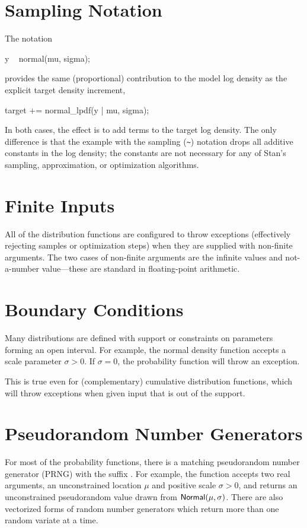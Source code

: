 \section{Sampling Notation}

The notation
%
\begin{stancode}
y ~ normal(mu, sigma);
\end{stancode}
%
provides the same (proportional) contribution to the model log density
as the explicit target density increment,
%
\begin{stancode}
target += normal_lpdf(y | mu, sigma);
\end{stancode}
%
In both cases, the effect is to add terms to the target log density.
The only difference is that the example with the sampling (\Verb|~|)
notation drops all additive constants in the log density;  the
constants are not necessary for any of Stan's sampling, approximation,
or optimization algorithms.

\section{Finite Inputs}

All of the distribution functions are configured to throw exceptions
(effectively rejecting samples or optimization steps) when they are
supplied with non-finite arguments.  The two cases of non-finite
arguments are the infinite values and not-a-number value---these are
standard in floating-point arithmetic.


\section{Boundary Conditions}

Many distributions are defined with support or constraints on
parameters forming an open interval.  For example, the normal density
function accepts a scale parameter $\sigma > 0$.  If $\sigma = 0$, the
probability function will throw an exception.

This is true even for (complementary) cumulative distribution
functions, which will throw exceptions when given input that is out of
the support.

\section{Pseudorandom Number Generators}\label{distributions-prng.section}

For most of the probability functions, there is a matching
pseudorandom number generator (PRNG) with the suffix .
For example, the function  accepts two
real arguments, an unconstrained location $\mu$ and positive scale
$\sigma > 0$, and returns an unconstrained pseudorandom value drawn
from $\mbox{\sf Normal}(\mu,\sigma)$.  There are also vectorized forms
of random number generators which return more than one random variate
at a time.

